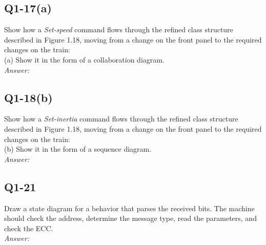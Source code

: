 \documentclass{article}
\begin{document}
\subsection*{ Q1-17(a) }%
Show how a \emph{Set-speed} command flows through the refined class structure described in Figure 1.18, moving from a change on the front panel to the required changes on the train:\\
(a) Show it in the form of a collaboration diagram. 
\\
\emph{Answer:}

\subsection*{ Q1-18(b) }%
Show how a \emph{Set-inertia} command flows through the refined class structure described in Figure 1.18, moving from a change on the front panel to the required changes on the train:\\
(b) Show it in the form of a sequence diagram.
\\
\emph{Answer:}

\subsection*{ Q1-21 }%
Draw a state diagram for a behavior that parses the received bits. The machine should check the address, determine the message type, read the parameters, and check the ECC.
\\
\emph{Answer:}
\end{document}
